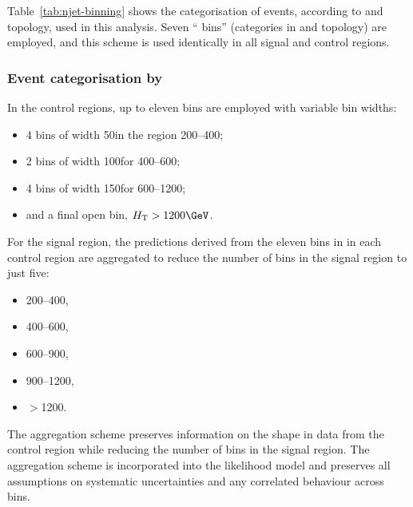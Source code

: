 Table~\ref{tab:njet-binning} shows the categorisation of events,
according to \njet and topology, used in this analysis. Seven ``\njet
bins'' (categories in \njet and topology) are employed, and this
scheme is used identically in all signal and control regions.

\subsubsection{Event categorisation by \texorpdfstring{\scalht}{HT}}
\label{sec:ht-categorisation}

In the control regions, up to eleven \scalht bins are employed with
variable bin widths:
\begin{itemize}
\item 4 bins of width 50\GeV in the region 200--400\GeV;
\item 2 bins of width 100\GeV for 400--600\GeV; 
\item 4 bins of width 150\GeV for 600--1200\GeV;
\item and a final open bin, $\scalht > 1200\GeV$. 
\end{itemize}

For the signal region, the predictions derived from the eleven bins in
\scalht in each control region are aggregated to reduce the number of
\scalht bins in the signal region to just five: 
\begin{itemize}
\item 200--400, 
\item 400--600,
\item 600--900, 
\item 900--1200, 
\item $>$1200\GeV.  
\end{itemize}

The aggregation scheme preserves information on the \scalht shape in
data from the control region while reducing the number of bins in the
signal region. The aggregation scheme is incorporated into the
likelihood model and preserves all assumptions on systematic
uncertainties and any correlated behaviour across bins. 


